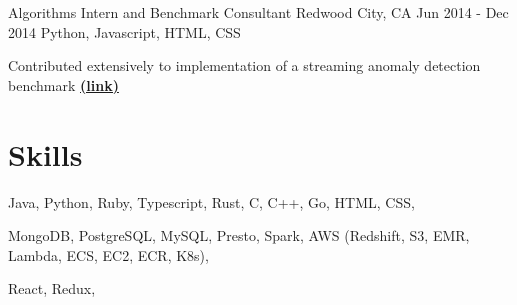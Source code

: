 \documentclass[letterpaper]{simjega-resume}
\begin{document}
{Algorithms Intern and Benchmark Consultant}
{Redwood City, CA}
{Jun 2014 - Dec 2014}
{Python, Javascript, HTML, CSS}
{\begin{tightitemize}
\item[] Contributed extensively to implementation of a streaming anomaly detection benchmark
\href{https://github.com/Numenta/NAB}{\bf (link)}
\end{tightitemize}}






\section{Skills}
\jgsectionline

{
Java,
Python,
Ruby,
Typescript,
Rust,
C,
C++,
Go,
HTML,
CSS,
}

{
MongoDB,
PostgreSQL,
MySQL,
Presto,
Spark,
AWS (Redshift, S3, EMR, Lambda, ECS, EC2, ECR, K8s),

React,
Redux,
}
\end{document}
